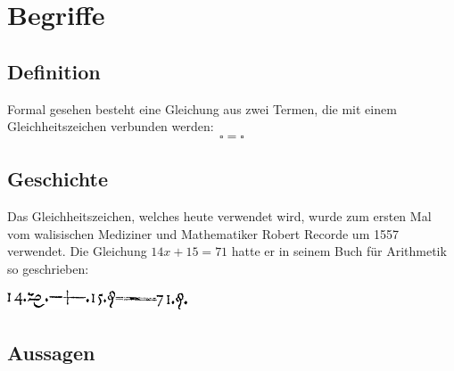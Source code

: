 \newpage
\section{Begriffe}

\subsection{Definition}

Formal gesehen besteht eine Gleichung aus zwei Termen, die mit einem Gleichheitszeichen verbunden werden:
\[
  \square = \square
\]

\subsection{Geschichte}

Das Gleichheitszeichen, welches heute verwendet wird, wurde zum ersten Mal vom walisischen Mediziner und Mathematiker Robert Recorde um 1557 verwendet. Die Gleichung $14x+15=71$ hatte er in seinem Buch für Arithmetik so geschrieben:
\begin{center}
  \includegraphics[width=0.4\textwidth]{Erste Gleichung.png}
\end{center}

\subsection{Aussagen}

